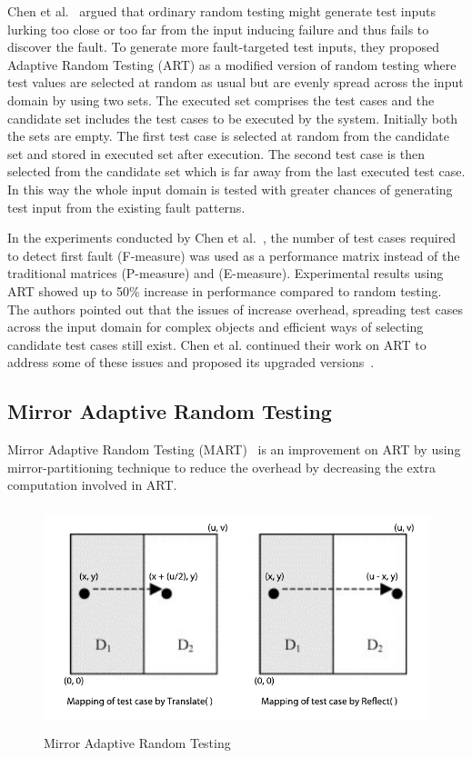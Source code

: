 Chen et al.~\cite{chen2005adaptive} argued that ordinary random testing might generate test inputs lurking too close or too far from the input inducing failure and thus fails to discover the fault. To generate more fault-targeted test inputs, they proposed Adaptive Random Testing (ART) as a modified version of random testing where test values are selected at random as usual but are evenly spread across the input domain by using two sets. The executed set comprises the test cases and the candidate set includes the test cases to be executed by the system. Initially both the sets are empty. The first test case is selected at random from the candidate set and stored in executed set after execution. The second test case is then selected from the candidate set which is far away from the last executed test case. In this way the whole input domain is tested with greater chances of generating test input from the existing fault patterns.

In the experiments conducted by Chen et al.~\cite{chen2005adaptive}, the number of test cases required to detect first fault (F-measure) was used as a performance matrix instead of the traditional matrices (P-measure) and (E-measure). Experimental results using ART showed up to 50\% increase in performance compared to random testing. The authors pointed out that the issues of increase overhead, spreading test cases across the input domain for complex objects and efficient ways of selecting candidate test cases still exist. Chen et al. continued their work on ART to address some of these issues and proposed its upgraded versions~\cite{chen2005adaptive, chen2009enhanced}. 

\subsection{Mirror Adaptive Random Testing}
Mirror Adaptive Random Testing (MART)~\cite{chen2004mirror} is an improvement on ART by using mirror-partitioning technique to reduce the overhead by decreasing the extra computation involved in ART. 

\begin{figure}[h]
\begin{center}
	\includegraphics[width=13.5cm, height=6.5cm ]{chapter2/mart2.pdf}
	\caption{Mirror Adaptive Random Testing~\cite{chen2004mirror}}
\label{fig:mirrorART}
\end{center}  
\end{figure}

